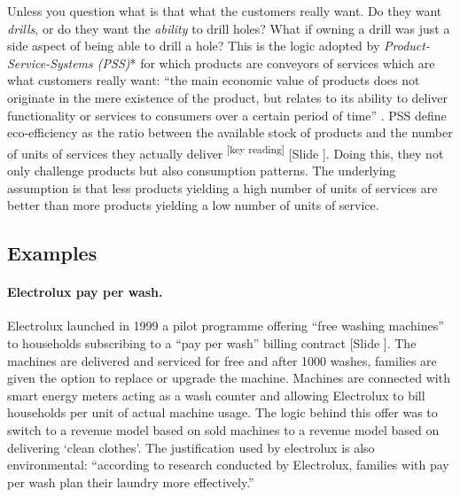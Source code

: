\documentclass{article}
\newcounter{slide}
\begin{document}
Unless you question what is that what the customers really want. Do they want \emph{drills}, or do they want the \emph{ability} to drill holes? What if owning a drill was just a side aspect of being able to drill a hole? This is the logic adopted by \emph{Product-Service-Systems (PSS)}* for which products are conveyors of services which are what customers really want: ``the main economic value of products does not originate in the mere existence of the product, but relates to its ability to deliver functionality or services to consumers over a certain period of time'' \cite{tukkerEightTypesProduct2004}. PSS define eco-efficiency as the ratio between the available stock of products and the number of units of services they actually deliver \cite{meijkampChangingConsumerBehaviour1999}\textsuperscript{\color{Magenta}[key reading]} {\color{blue}[Slide ]}. Doing this, they not only challenge products but also consumption patterns. The underlying assumption is that less products yielding a high number of units of services are better than more products yielding a low number of units of service. 

\subsection{Examples}
\label{sec:pssExamples}

\paragraph{Electrolux pay per wash.}\label{Electrolux}
Electrolux launched in 1999 a pilot programme offering ``free washing machines'' to households subscribing to a ``pay per wash'' billing contract \href{https://www.electroluxgroup.com/en/electrolux-offers-7000-households-free-washing-machines-1885/}{\cite{eletroluxElectroluxOffers0001999}} {\color{blue}[Slide ]}. The machines are delivered and serviced for free and after 1000 washes, families are given the option to replace or upgrade the machine. Machines are connected with smart energy meters acting as a wash counter and allowing Electrolux to bill households per unit of actual machine usage. The logic behind this offer was to switch to a revenue model based on sold machines to a revenue model based on delivering `clean clothes'. The justification used by electrolux is also environmental: ``according to research conducted by Electrolux, families with pay per wash plan their laundry more effectively.''
\end{document}
